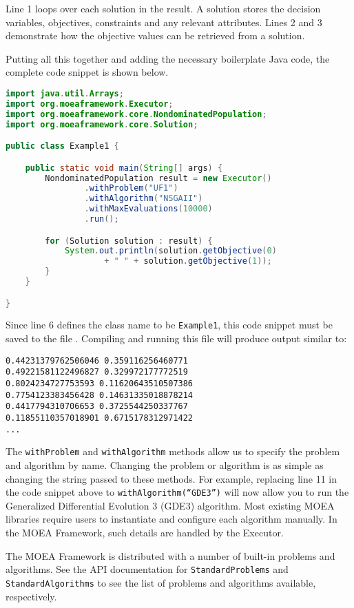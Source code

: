 Line 1 loops over each solution in the result.  A solution stores the decision variables, objectives, constraints and any relevant attributes.  Lines 2 and 3 demonstrate how the objective values can be retrieved from a solution.

Putting all this together and adding the necessary boilerplate Java code, the complete code snippet is shown below.

\begin{lstlisting}[language=Java]
import java.util.Arrays;
import org.moeaframework.Executor;
import org.moeaframework.core.NondominatedPopulation;
import org.moeaframework.core.Solution;

public class Example1 {

	public static void main(String[] args) {
		NondominatedPopulation result = new Executor()
				.withProblem("UF1")
				.withAlgorithm("NSGAII")
				.withMaxEvaluations(10000)
				.run();

		for (Solution solution : result) {
			System.out.println(solution.getObjective(0) 
					+ " " + solution.getObjective(1));
		}
	}

}
\end{lstlisting}

Since line 6 defines the class name to be \texttt{Example1}, this code snippet must be saved to the file .  Compiling and running this file will produce output similar to:

\begin{lstlisting}[language=Plaintext]
0.44231379762506046 0.359116256460771
0.49221581122496827 0.329972177772519
0.8024234727753593 0.11620643510507386
0.7754123383456428 0.14631335018878214
0.4417794310706653 0.3725544250337767
0.11855110357018901 0.6715178312971422
...
\end{lstlisting}

The \texttt{withProblem} and \texttt{withAlgorithm} methods allow us to specify the problem and algorithm by name.  Changing the problem or algorithm is as simple as changing the string passed to these methods.  For example, replacing line 11 in the code snippet above to \texttt{withAlgorithm(``GDE3'')} will now allow you to run the Generalized Differential Evolution 3 (GDE3) algorithm.  Most existing MOEA libraries require users to instantiate and configure each algorithm manually.  In the MOEA Framework, such details are handled by the Executor.

The MOEA Framework is distributed with a number of built-in problems and algorithms.  See the API documentation for \texttt{StandardProblems} and \texttt{StandardAlgorithms} to see the list of problems and algorithms available, respectively.


